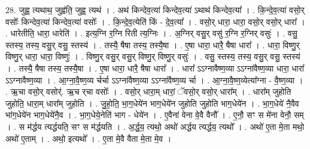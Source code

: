\documentclass[17pt]{extarticle}
\begin{document}
28. जुह्व॒ त्यथाथ॒ जुह्व॑ति॒ जुह्व॒ त्यथ॑ । . अथ॑ किन्देव॒त्या॑ किन्देव॒त्या॑ ऽथाथ॑ किन्देव॒त्या᳚ । . कि॒न्दे॒व॒त्या॑ वसो॒र् वसोः᳚ किन्देव॒त्या॑ किन्देव॒त्या॑ वसोः᳚ । . कि॒न्दे॒व॒त्येति॑ किं - दे॒व॒त्या᳚ । . वसो॒र् धारा॒ धारा॒ वसो॒र् वसो॒र् धारा᳚ । . धारेतीति॒ धारा॒ धारेति॑ । . इत्य॒ग्नि र॒ग्नि रिती त्य॒ग्निः । . अ॒ग्निर् वसु॒र् वसु॑ र॒ग्नि र॒ग्निर् वसुः॑ । . वसु॒ स्तस्य॒ तस्य॒ वसु॒र् वसु॒ स्तस्य॑ । . तस्यै॒ षैषा तस्य॒ तस्यै॒षा । . ए॒षा धारा॒ धारै॒ षैषा धारा᳚ । . धारा॒ विष्णु॒र् विष्णु॒र् धारा॒ धारा॒ विष्णुः॑ । . विष्णु॒र् वसु॒र् वसु॒र् विष्णु॒र् विष्णु॒र् वसुः॑ । . वसु॒ स्तस्य॒ तस्य॒ वसु॒र् वसु॒ स्तस्य॑ । . तस्यै॒ षैषा तस्य॒ तस्यै॒षा । . ए॒षा धारा॒ धारै॒ षैषा धारा᳚ । . धारा᳚ ऽऽग्नावैष्ण॒व्या ऽऽग्ना॑वैष्ण॒व्या धारा॒ धारा᳚ ऽऽग्नावैष्ण॒व्या । . आ॒ग्ना॒वै॒ष्ण॒व्य र्चर्चा ऽऽग्ना॑वैष्ण॒व्या ऽऽग्ना॑वैष्ण॒व्य र्चा । . आ॒ग्ना॒वै॒ष्ण॒व्येत्या᳚ग्ना - वै॒ष्ण॒व्या । . ऋ॒चा वसो॒र् वसोर्॑. ऋ॒च र्‌चा वसोः᳚ । . वसो॒र् धारा॒म् धारां॒ ॅवसो॒र् वसो॒र् धारा᳚म् । . धारा᳚म् जुहोति जुहोति॒ धारा॒म् धारा᳚म् जुहोति । . जु॒हो॒ति॒ भा॒ग॒धेये॑न भाग॒धेये॑न जुहोति जुहोति भाग॒धेये॑न । . भा॒ग॒धेये॑ नै॒वैव भा॑ग॒धेये॑न भाग॒धेये॑नै॒व । . भा॒ग॒धेये॒नेति॑ भाग - धेये॑न । . ए॒वैना॑ वेना वे॒वै वैनौ᳚ । . ए॒नौ॒ सꣳ स मे॑ना वेनौ॒ सम् । . स म॑र्द्धय त्यर्द्धयति॒ सꣳ स म॑र्द्धयति । . अ॒र्द्ध॒य॒ त्यथो॒ अथो॑ अर्द्धय त्यर्द्धय॒ त्यथो᳚ । . अथो॑ ए॒ता मे॒ता मथो॒ अथो॑ ए॒ताम् । . अथो॒ इत्यथो᳚ । . ए॒ता मे॒वै वैता मे॒ता मे॒व । \newline
\end{document}
